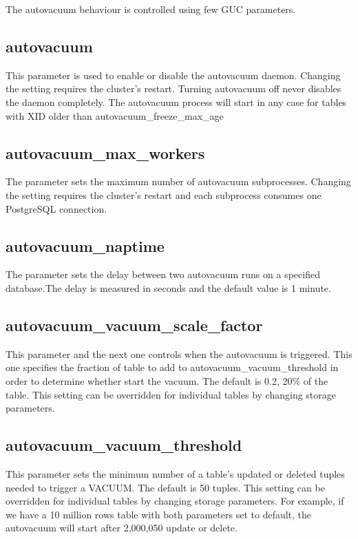 The autovacuum behaviour is controlled using few GUC parameters.

\subsection{autovacuum} 
This parameter is used to enable or disable the autovacuum daemon. Changing the setting requires 
the cluster's restart. Turning autovacuum off never disables the daemon completely. The autovacuum 
process will start in any case for tables with XID older than autovacuum\_freeze\_max\_age

\subsection{autovacuum\_max\_workers} 
The parameter sets the maximum number of autovacuum subprocesses. Changing the setting requires the 
cluster's restart and each subprocess consumes one PostgreSQL connection.

\subsection{autovacuum\_naptime} 
The parameter sets the delay between two autovacuum runs on a specified database.The delay is 
measured in seconds and the default value is 1 minute.


\subsection{autovacuum\_vacuum\_scale\_factor}
This parameter and the next one controls when the autovacuum is triggered. This one specifies the 
fraction of table to add to autovacuum\_vacuum\_threshold in order to determine whether start the 
vacuum. The default is 0.2,  20\% of the table. This setting can be overridden for individual 
tables by changing storage parameters.

\subsection{autovacuum\_vacuum\_threshold}
This parameter sets the minimum number of a table's updated or deleted tuples needed to trigger 
a VACUUM. The default is 50 tuples. This setting can be overridden for individual 
tables by changing storage parameters. For example, if we have a 10 million rows table with both 
parameters set to default, the autovacuum will start after 2,000,050 update or delete.

